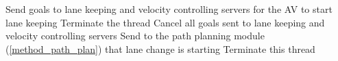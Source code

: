 \begin{itemize}
\begin{algorithm}[H]
{{{                    {Send goals to lane keeping and velocity controlling servers for the AV to start lane keeping\;}
                    Terminate the thread\;
                    }
                    {
                    Cancel all goals sent to lane keeping and velocity controlling servers\;
                    Send to the path planning module\; (\ref{method_path_plan}) that lane change is starting\;
                    Terminate this thread\;
                    }
                    }
                  }
                \caption{Navigation Master Algorithm}
            \end{algorithm} 
        
\end{itemize}

